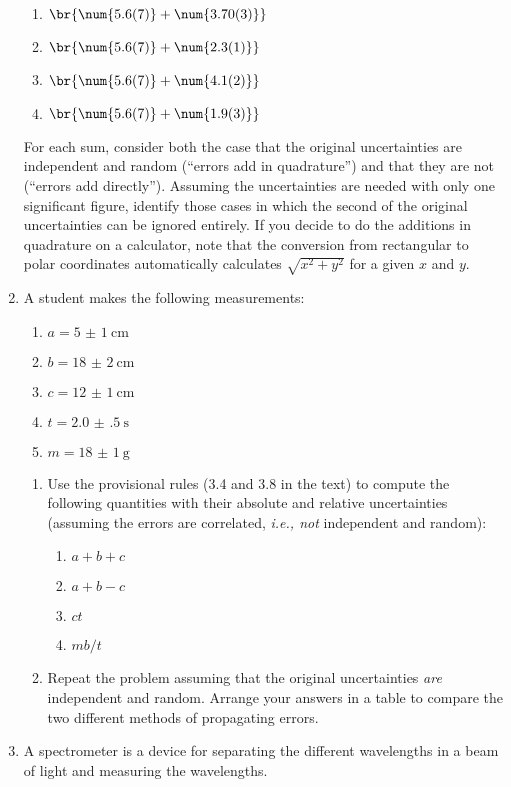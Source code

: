 \documentclass[nobib,nofonts,nols,nohyper]{tufte-handout}
\begin{document}
\begin{enumerate}
	\begin{enumerate}
		\item \( \br{\num{5.6(7)} + \num{3.70(3)}} \)
		\item \( \br{\num{5.6(7)} + \num{2.3(1)}} \)
		\item \( \br{\num{5.6(7)} + \num{4.1(2)}} \)
		\item \( \br{\num{5.6(7)} + \num{1.9(3)}} \)
	\end{enumerate}
	For each sum, consider both the case that the original uncertainties are independent and random (``errors add in quadrature'') and that they are not (``errors add directly''). 
	Assuming the uncertainties are needed with only one significant figure, identify those cases in which the second of the original uncertainties can be ignored entirely. 
	If you decide to do the additions in quadrature on a calculator, note that the conversion from rectangular to polar coordinates automatically calculates \( \sqrt{x^2 + y^2} \) for a given \( x \) and \( y \). 
	\item A student makes the following measurements:
	\begin{enumerate}
		\item \( a = \SI{5(1)}{\cm} \)
		\item \( b = \SI{18(2)}{\cm} \)
		\item \( c = \SI{12(1)}{\cm} \)
		\item \( t = \SI{2.0(5)}{\s} \)
		\item \( m = \SI{18(1)}{\g} \)
	\end{enumerate}
	\begin{enumerate}
		\item Use the provisional rules (3.4 and 3.8 in the text) to compute the following quantities with their absolute and relative uncertainties (assuming the errors are correlated, \emph{i.e., not} independent and random):
	\begin{enumerate}
		\item \( a + b + c \)
		\item \( a + b - c \)
		\item \( ct \)
		\item \( mb/t \)
	\end{enumerate}
	\item Repeat the problem assuming that the original uncertainties \emph{are} independent and random. 
	Arrange your answers in a table to compare the two different methods of propagating errors. 
	\end{enumerate}
	\item A spectrometer is a device for separating the different wavelengths in a beam of light and measuring the wavelengths. 

\end{enumerate}
\end{document}
